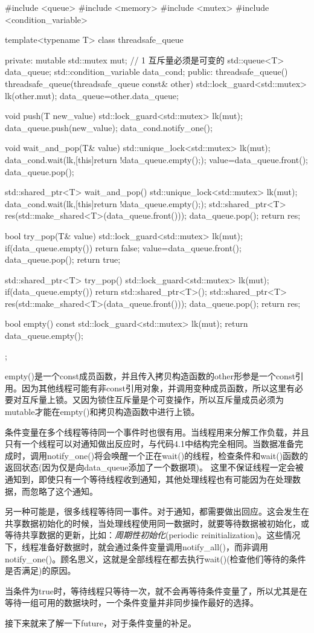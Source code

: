 \begin{cpp}
#include <queue>
#include <memory>
#include <mutex>
#include <condition_variable>

template<typename T>
class threadsafe_queue
{
private:
  mutable std::mutex mut;  // 1 互斥量必须是可变的
  std::queue<T> data_queue;
  std::condition_variable data_cond;
public:
  threadsafe_queue()
  {}
  threadsafe_queue(threadsafe_queue const& other)
  {
    std::lock_guard<std::mutex> lk(other.mut);
    data_queue=other.data_queue;
  }

  void push(T new_value)
  {
    std::lock_guard<std::mutex> lk(mut);
    data_queue.push(new_value);
    data_cond.notify_one();
  }

  void wait_and_pop(T& value)
  {
    std::unique_lock<std::mutex> lk(mut);
    data_cond.wait(lk,[this]{return !data_queue.empty();});
    value=data_queue.front();
    data_queue.pop();
  }

  std::shared_ptr<T> wait_and_pop()
  {
    std::unique_lock<std::mutex> lk(mut);
    data_cond.wait(lk,[this]{return !data_queue.empty();});
    std::shared_ptr<T> res(std::make_shared<T>(data_queue.front()));
    data_queue.pop();
    return res;
  }

  bool try_pop(T& value)
  {
    std::lock_guard<std::mutex> lk(mut);
    if(data_queue.empty())
      return false;
    value=data_queue.front();
    data_queue.pop();
    return true;
  }

  std::shared_ptr<T> try_pop()
  {
    std::lock_guard<std::mutex> lk(mut);
    if(data_queue.empty())
      return std::shared_ptr<T>();
    std::shared_ptr<T> res(std::make_shared<T>(data_queue.front()));
    data_queue.pop();
    return res;
  }

  bool empty() const
  {
    std::lock_guard<std::mutex> lk(mut);
    return data_queue.empty();
  }
};
\end{cpp}

empty()是一个const成员函数，并且传入拷贝构造函数的other形参是一个const引用。因为其他线程可能有非const引用对象，并调用变种成员函数，所以这里有必要对互斥量上锁。又因为锁住互斥量是个可变操作，所以互斥量成员必须为mutable才能在empty()和拷贝构造函数中进行上锁。

条件变量在多个线程等待同一个事件时也很有用。当线程用来分解工作负载，并且只有一个线程可以对通知做出反应时，与代码4.1中结构完全相同。当数据准备完成时，调用notify\_one()将会唤醒一个正在wait()的线程，检查条件和wait()函数的返回状态(因为仅是向data\_queue添加了一个数据项)。 这里不保证线程一定会被通知到，即使只有一个等待线程收到通知，其他处理线程也有可能因为在处理数据，而忽略了这个通知。

另一种可能是，很多线程等待同一事件。对于通知，都需要做出回应。这会发生在共享数据初始化的时候，当处理线程使用同一数据时，就要等待数据被初始化，或等待共享数据的更新，比如：\textit{周期性初始化}(periodic reinitialization)。这些情况下，线程准备好数据时，就会通过条件变量调用notify\_all()，而非调用notify\_one()。顾名思义，这就是全部线程在都去执行wait()(检查他们等待的条件是否满足)的原因。

当条件为true时，等待线程只等待一次，就不会再等待条件变量了，所以尤其是在等待一组可用的数据块时，一个条件变量并非同步操作最好的选择。

接下来就来了解一下future，对于条件变量的补足。